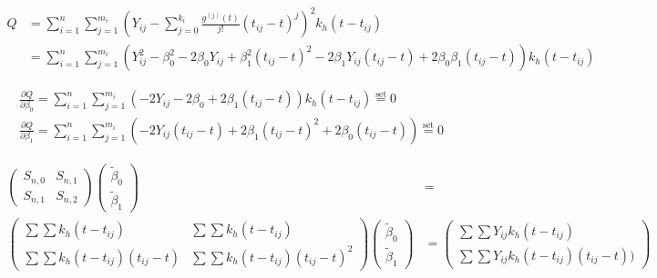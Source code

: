 \documentclass[UTF8,a4paper,10pt]{article}
\begin{document}
  

  \begin{solution}\,\\

  \begin{equation*}
    \begin{aligned}
      Q &= \sum_{i=1}^{n}\sum_{j=1}^{m_i}  (Y_{ij}-\sum_{j=0}^{k_i}\frac{g^{(j)}(t)}{j!}(t_{ij}-t)^{j})^2k_{h}(t-t_{ij}) \\
      &= \sum_{i=1}^{n}\sum_{j=1}^{m_i} (Y_{ij}^2-\beta_0^2-2\beta_0Y_{ij}+\beta_1^2(t_{ij}-t)^2-2\beta_1Y_{ij}(t_{ij}-t)+2\beta_0\beta_1(t_{ij}-t))k_h(t-t_{ij})
    \end{aligned}
  \end{equation*}

  \begin{equation*}
    \begin{aligned}
      \frac{\partial Q}{\partial\beta_0} = \sum_{i=1}^{n}\sum_{j=1}^{m_i} (-2Y_{ij}-2\beta_0+2\beta_1(t_{ij}-t))k_h(t-t_{ij})\overset{\text{set}}{=} 0\\
      \frac{\partial Q}{\partial\beta_1} = \sum_{i=1}^{n}\sum_{j=1}^{m_i} (-2Y_{ij}(t_{ij}-t)+2\beta_1(t_{ij}-t)^2 +2\beta_0(t_{ij}-t))\overset{\text{set}}{=} 0
    \end{aligned}
  \end{equation*}

  \begin{equation*}
    \begin{aligned}
      \begin{pmatrix}
        S_{n,0} & S_{n,1}\\
        S_{n,1} & S_{n,2}
      \end{pmatrix}
    \begin{pmatrix}
      \tilde{\beta}_0\\
      \tilde{\beta}_1
    \end{pmatrix} 
    & =\\
      \begin{pmatrix}
        \sum\sum k_h(t-t_{ij}) & \sum\sum k_h(t-t_{ij})\\
        \sum\sum k_h(t-t_{ij})(t_{ij}-t) &  \sum\sum k_h(t-t_{ij})(t_{ij}-t)^2
      \end{pmatrix}
    \begin{pmatrix}
      \tilde{\beta}_0\\
      \tilde{\beta}_1
    \end{pmatrix}
    & =     
    \begin{pmatrix}
      \sum\sum Y_{ij}k_h(t-t_{ij})\\
      \sum\sum Y_{ij}k_h(t-t_{ij})(t_{ij}-t))
    \end{pmatrix}
    \end{aligned}
  \end{equation*}


\end{solution}
\end{document}
